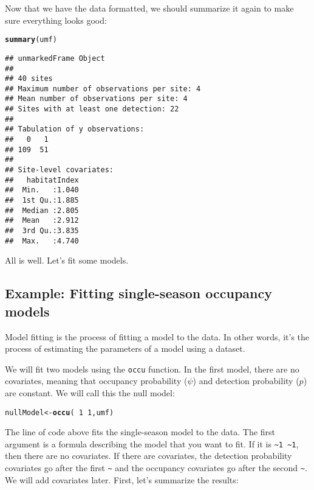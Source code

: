 \documentclass[12pt]{article}\usepackage[]{graphicx}\usepackage[]{color}
\makeatletter
\newcommand{\hlnum}[1]{\textcolor[rgb]{0.686,0.059,0.569}{#1}}%
\newcommand{\hlopt}[1]{\textcolor[rgb]{0,0,0}{#1}}%
\newcommand{\hlstd}[1]{\textcolor[rgb]{0.345,0.345,0.345}{#1}}%
\newcommand{\hlkwb}[1]{\textcolor[rgb]{0.69,0.353,0.396}{#1}}%
\newcommand{\hlkwd}[1]{\textcolor[rgb]{0.737,0.353,0.396}{\textbf{#1}}}%
\newenvironment{kframe}{%
 \def\at@end@of@kframe{}%
 \ifinner\ifhmode%
  \def\at@end@of@kframe{\end{minipage}}%
  \begin{minipage}{\columnwidth}%
 \fi\fi%
 \def\FrameCommand##1{\hskip\@totalleftmargin \hskip-\fboxsep
 \colorbox{shadecolor}{##1}\hskip-\fboxsep
     \hskip-\linewidth \hskip-\@totalleftmargin \hskip\columnwidth}%
 \MakeFramed {\advance\hsize-\width
   \@totalleftmargin\z@ \linewidth\hsize
   \@setminipage}}%
 {\par\unskip\endMakeFramed%
 \at@end@of@kframe}
\newenvironment{knitrout}{}{} %
\makeatother
\begin{document}
Now that we have the data formatted, we should summarize it again to
make sure everything looks good: 

\begin{knitrout}
\color{fgcolor}\begin{kframe}
\begin{alltt}
\hlkwd{summary}\hlstd{(umf)}
\end{alltt}
\begin{verbatim}
## unmarkedFrame Object
## 
## 40 sites
## Maximum number of observations per site: 4 
## Mean number of observations per site: 4 
## Sites with at least one detection: 22 
## 
## Tabulation of y observations:
##   0   1 
## 109  51 
## 
## Site-level covariates:
##   habitatIndex  
##  Min.   :1.040  
##  1st Qu.:1.885  
##  Median :2.805  
##  Mean   :2.912  
##  3rd Qu.:3.835  
##  Max.   :4.740
\end{verbatim}
\end{kframe}
\end{knitrout}

All is well. Let's fit some models. 



\subsection*{Example: Fitting single-season occupancy models}

Model fitting is the process of fitting a model to the data. In other
words, it's the process of estimating the parameters of a model using
a dataset. 

We will fit two models using the \texttt{occu} function. In the first
model, there are no covariates, meaning that occupancy probability
($\psi$) and detection probability ($p$) are constant. We will call
this the null model: 

\begin{knitrout}
\color{fgcolor}\begin{kframe}
\begin{alltt}
\hlstd{nullModel} \hlkwb{<-} \hlkwd{occu}\hlstd{(}\hlopt{~}\hlnum{1} \hlopt{~}\hlnum{1}\hlstd{, umf)}
\end{alltt}
\end{kframe}
\end{knitrout}

The line of code above fits the single-season model to the data. The
first argument is a formula 
describing the model that you want to fit. If it is \verb+~1 ~1+, then
there are no covariates. If there are covariates, the detection
probability covariates go after the first \verb+~+ and the occupancy
covariates go after the second \verb+~+. We will add covariates
later. First, let's summarize the results: 
\end{document}
